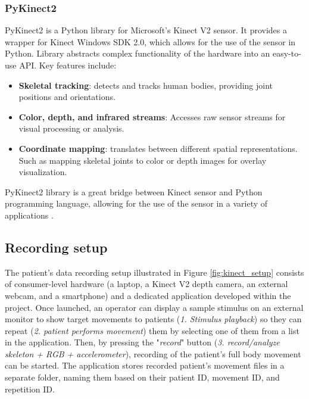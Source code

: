                     \subsubsection{PyKinect2}
                        PyKinect2 is a Python library for Microsoft's Kinect V2 sensor. It provides a wrapper for Kinect Windows SDK 2.0, which allows for the use of the sensor in Python. Library abstracts complex functionality of the hardware into an easy-to-use API. Key features include:
                        \begin{itemize}
                            \item \textbf{Skeletal tracking}: detects and tracks human bodies, providing joint positions and orientations.
                            \item \textbf{Color, depth, and infrared streams}: Accesses raw sensor streams for visual processing or analysis.
                            \item \textbf{Coordinate mapping}: translates between different spatial representations. Such as mapping skeletal joints to color or depth images for overlay visualization.
                        \end{itemize}
                        PyKinect2 library is a great bridge between Kinect sensor and Python programming language, allowing for the use of the sensor in a variety of applications \cite{GitHubKinectPyKinect2}.
               
                        \newpage
                        
        \subsection{Recording setup}

                    The patient's data recording setup illustrated in Figure \ref{fig:kinect_setup} consists of consumer-level hardware (a laptop, a Kinect V2 depth camera, an external webcam, and a smartphone) and a dedicated application developed within the project. 
                    Once launched, an operator can display a sample stimulus on an external monitor to show target movements to patients (\textit{1. Stimulus playback}) so they can repeat (\textit{2. patient performs movement}) them by selecting one of them from a list in the application.
                    Then, by pressing the "\textit{record}" button (\textit{3. record/analyze skeleton + RGB + accelerometer}), recording of the patient's full body movement can be started. 
                    The application stores recorded patient's movement files in a separate folder, naming them based on their patient ID, movement ID, and repetition ID.


